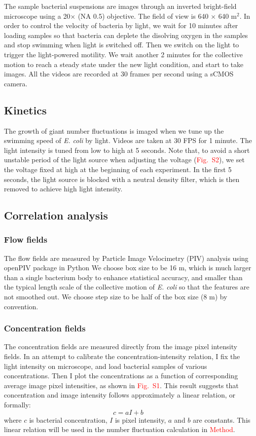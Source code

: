 \documentclass[preprint,aps,prl,amsmath,amssymb,longbibliography]{revtex4-2}
\begin{document}
The sample bacterial suspensions are images through an inverted bright-field microscope using a 20$\times$ (NA 0.5) objective. The field of view is 640 $\times$ 640 \textmu m$^2$. %
In order to control the velocity of bacteria by light, we wait for 10 minutes after loading samples so that bacteria can deplete the disolving oxygen in the samples and stop swimming when light is switched off. Then we switch on the light to trigger the light-powered motility. We wait another 2 minutes for the collective motion to reach a steady state under the new light condition, and start to take images. All the videos are recorded at 30 frames per second using a sCMOS camera.

\subsection{Kinetics}
The growth of giant number fluctuations is imaged when we tune up the swimming speed of \textit{E. coli} by light. Videos are taken at 30 FPS for 1 minute. The light intensity is tuned from low to high at 5 seconds. Note that, to avoid a short unstable period of the light source when adjusting the voltage (\textcolor{red}{Fig.~S2}), we set the voltage fixed at high at the beginning of each experiment. In the first 5 seconds, the light source is blocked with a neutral density filter, which is then removed to achieve high light intensity.





\subsection{Correlation analysis}

\subsubsection{Flow fields}
The flow fields are measured by Particle Image Velocimetry (PIV) analysis using openPIV package in Python %
We choose box size to be 16 \textmu m, which is much larger than a single bacterium body to enhance statistical accuracy, and smaller than the typical length scale of the collective motion of \textit{E. coli} so that the features are not smoothed out. We choose step size to be half of the box size (8 \textmu m) by convention.

\subsubsection{Concentration fields}
The concentration fields are measured directly from the image pixel intensity fields. In an attempt to calibrate the concentration-intensity relation, I fix the light intensity on microscope, and load bacterial samples of various concentrations. Then I plot the concentrations as a function of corresponding average image pixel intensities, as shown in \textcolor{red}{Fig.~S1}. This result suggests that concentration and image intensity follows approximately a linear relation, or formally:
$$ c = aI + b $$
where $c$ is bacterial concentration, $I$ is pixel intensity, $a$ and $b$ are constants. This linear relation will be used in the number fluctuation calculation in \textcolor{red}{Method}.
\end{document}
